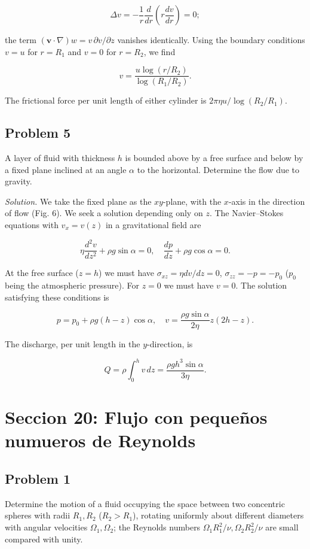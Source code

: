 \documentclass{article}
\begin{document}
$$
\Delta v = -\frac{1}{r} \frac{d}{dr} \left( r \frac{dv}{dr} \right) = 0;
$$

the term $(\mathbf{v} \cdot \nabla)w = v \, \partial v/\partial z$ vanishes identically. Using the boundary conditions $v = u$ for $r = R_1$ and $v = 0$ for $r = R_2$, we find

$$
v = \frac{u \log(r/R_2)}{\log(R_1/R_2)}.
$$

The frictional force per unit length of either cylinder is $2\pi \eta u/\log(R_2/R_1)$.

\subsection*{Problem 5}

A layer of fluid with thickness $h$ is bounded above by a free surface and below by a fixed plane inclined at an angle $\alpha$ to the horizontal. Determine the flow due to gravity.

\textit{Solution.} We take the fixed plane as the $xy$-plane, with the $x$-axis in the direction of flow (Fig. 6). We seek a solution depending only on $z$. The Navier–Stokes equations with $v_x = v(z)$ in a gravitational field are

$$
\eta \frac{d^2 v}{dz^2} + \rho g \sin \alpha = 0, \quad \frac{dp}{dz} + \rho g \cos \alpha = 0.
$$

At the free surface ($z = h$) we must have $\sigma_{xz} = \eta dv/dz = 0$, $\sigma_{zz} = -p = -p_0$ ($p_0$ being the atmospheric pressure). For $z = 0$ we must have $v = 0$. The solution satisfying these conditions is

$$
p = p_0 + \rho g (h - z) \cos \alpha, \quad v = \frac{\rho g \sin \alpha}{2\eta} z(2h - z).
$$

The discharge, per unit length in the $y$-direction, is

$$
Q = \rho \int_0^h v \, dz = \frac{\rho g h^3 \sin \alpha}{3\eta}.
$$

\section*{Seccion 20: Flujo con pequeños numueros de Reynolds}

\subsection*{Problem 1}

Determine the motion of a fluid occupying the space between two concentric spheres with radii $R_1, R_2$ ($R_2 > R_1$), rotating uniformly about different diameters with angular velocities $\Omega_1, \Omega_2$; the Reynolds numbers $\Omega_1 R_1^2/\nu, \Omega_2 R_2^2/\nu$ are small compared with unity.
\end{document}
